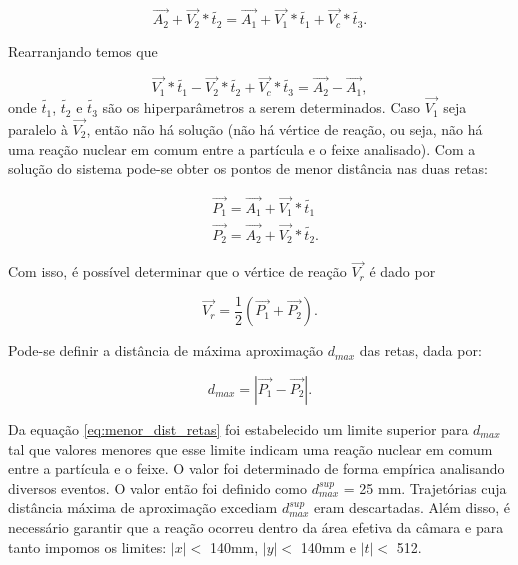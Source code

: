 \documentclass[a4paper,12pt,oneside]{book}
\begin{document}
\begin{equation*}
    \vec{A_2} + \vec{V_2} * \tilde{t_2} = \vec{A_1} + \vec{V_1} * \tilde{t_1} + \vec{V_c} * \tilde{t_3}.
\end{equation*}

Rearranjando temos que

\begin{equation}\label{eq:sistema_vertice}
    \vec{V_1} * \tilde{t_1} - \vec{V_2} * \tilde{t_2} + \vec{V_c} * \tilde{t_3} = \vec{A_2} - \vec{A_1},
\end{equation}
%
onde $\tilde{t_1}$, $\tilde{t_2}$ e $\tilde{t_3}$ são os hiperparâmetros a serem determinados. Caso $\vec{V_1}$ seja paralelo à $\vec{V_2}$, então não há solução (não há vértice de reação, ou seja, não há uma reação nuclear em comum entre a partícula e o feixe analisado). Com a solução do sistema pode-se obter os pontos de menor distância nas duas retas:

\begin{equation}
\begin{split}
        &\vec{P_1} = \vec{A_1} + \vec{V_1} * \tilde{t_1} \\
        &\vec{P_2} = \vec{A_2} + \vec{V_2} * \tilde{t_2}.
\end{split}
\end{equation}

\par Com isso, é possível determinar que o vértice de reação $\vec{V_r}$ é dado por

\begin{equation} \label{eq:vertice_reacao}
    \vec{V_r} = \frac{1}{2}(\vec{P_1} + \vec{P_2}).
\end{equation}

\par Pode-se definir a distância de máxima aproximação $d_{max}$ das retas, dada por:

\begin{equation} \label{eq:menor_dist_retas}
    d_{max} = \left | \vec{P_1} - \vec{P_2} \right |.
\end{equation}


\par Da equação \ref{eq:menor_dist_retas} foi estabelecido um limite superior para $d_{max}$ tal que valores menores que esse limite indicam uma reação nuclear em comum entre a partícula e o feixe. O valor foi determinado de forma empírica analisando diversos eventos. O valor então foi definido como $d_{max}^{sup}$ = 25 mm. Trajetórias cuja distância máxima de aproximação excediam $d_{max}^{sup}$ eram descartadas. Além disso, é necessário garantir que a reação ocorreu dentro da área efetiva da câmara e para tanto impomos os limites: $|x| < $ 140mm, $|y| < $ 140mm e $|t| < $ 512.
\end{document}
